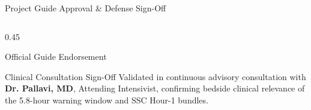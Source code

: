 \documentclass[aspectratio=169, 10pt]{beamer}
\begin{document}
\begin{frame}{Project Guide Approval \& Defense Sign-Off}
\begin{columns}
\begin{column}{0.45\textwidth}
\begin{block}{Official Guide Endorsement}
\begin{itemize}
\begin{itemize}
                    \end{itemize}
                \end{itemize}
            \end{block}
            \begin{alertblock}{Clinical Consultation Sign-Off}
                \scriptsize
                Validated in continuous advisory consultation with \textbf{Dr. Pallavi, MD}, Attending Intensivist, confirming bedside clinical relevance of the 5.8-hour warning window and SSC Hour-1 bundles.
            \end{alertblock}
        \end{column}
    \end{columns}
\end{frame}

\end{document}
